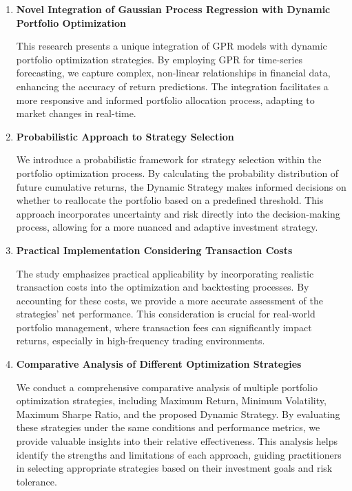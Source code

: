 \begin{enumerate}
    \item \textbf{Novel Integration of Gaussian Process Regression with Dynamic Portfolio Optimization}

    This research presents a unique integration of \ac{GPR} models with dynamic portfolio optimization strategies. By employing \ac{GPR} for time-series forecasting, we capture complex, non-linear relationships in financial data, enhancing the accuracy of return predictions. The integration facilitates a more responsive and informed portfolio allocation process, adapting to market changes in real-time.

    \item \textbf{Probabilistic Approach to Strategy Selection}

    We introduce a probabilistic framework for strategy selection within the portfolio optimization process. By calculating the probability distribution of future cumulative returns, the Dynamic Strategy makes informed decisions on whether to reallocate the portfolio based on a predefined threshold. This approach incorporates uncertainty and risk directly into the decision-making process, allowing for a more nuanced and adaptive investment strategy.

    \item \textbf{Practical Implementation Considering Transaction Costs}

    The study emphasizes practical applicability by incorporating realistic transaction costs into the optimization and backtesting processes. By accounting for these costs, we provide a more accurate assessment of the strategies' net performance. This consideration is crucial for real-world portfolio management, where transaction fees can significantly impact returns, especially in high-frequency trading environments.

    \item \textbf{Comparative Analysis of Different Optimization Strategies}

    We conduct a comprehensive comparative analysis of multiple portfolio optimization strategies, including Maximum Return, Minimum Volatility, Maximum Sharpe Ratio, and the proposed Dynamic Strategy. By evaluating these strategies under the same conditions and performance metrics, we provide valuable insights into their relative effectiveness. This analysis helps identify the strengths and limitations of each approach, guiding practitioners in selecting appropriate strategies based on their investment goals and risk tolerance.

\end{enumerate}

